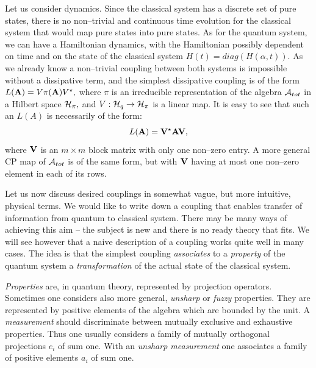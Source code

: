 \documentclass[12pt]{article}
\begin{document}
Let us consider dynamics.  Since the classical system has a discrete
set of pure states,  there is no non--trivial and continuous  time
evolution for the
classical system that would map pure states into pure states. 
 As for the quantum system,  we can have a Hamiltonian dynamics,  with
the Hamiltonian possibly dependent on time and on the state of the 
classical
system $H (t) = diag (H (\alpha, t)) . $ As we already know a non--trivial
coupling between both systems is impossible without a dissipative
term,  and the simplest dissipative coupling is of the form
$L ({\bf A})=V\pi ({\bf A})V^\star , $ where $\pi$ is an irreducible
representation of the algebra ${\cal A}_{tot}$ in a Hilbert space
${\cal H}_\pi , $ and $V: {\cal H}_q\rightarrow{\cal H}_\pi$ is a linear
map.  It is easy to see that such an $L (A)$ is necessarily of the form: 
$$L ({\bf A})={\bf V}^\star {\bf A} {\bf V} , $$
where ${\bf V}$ is an $m\times m$ block matrix with only one non--zero
entry.  A more general CP map of ${\cal A}_{tot}$ is of the same form, 
but with ${\bf V}$ having at most one non--zero element in each of its
rows.

Let us now discuss   desired couplings in somewhat vague,  but more
intuitive,  physical terms.  We would like to write down a coupling that
enables transfer of information from quantum to classical system. 
There may be many ways of achieving this aim -- the subject is new and
there is no ready theory that fits.
We will see however that a naive
description of a coupling works quite well in many cases.  The idea is 
that the simplest coupling {\sl associates} to a {\sl property} of the
quantum system a {\sl transformation} of the actual state of the
classical system. 

{\sl Properties} are,  in quantum theory,  represented by projection
operators.  Sometimes one considers also more general,  {\sl unsharp} or
{\sl fuzzy} properties.  They are represented by positive elements of
the algebra which are bounded by the unit. A {\sl measurement} should
discriminate between mutually exclusive and exhaustive properties. 
Thus one usually considers a family of mutually orthogonal projections
$e_i$ of sum one.  With an {\sl unsharp measurement} one associates 
a family
of positive elements $a_i$ of sum one.
\end{document}
